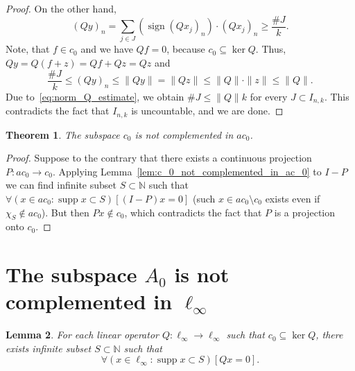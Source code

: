 \documentclass[a4paper,10pt]{article} %
\DeclareMathOperator{\supp}{supp}
\theoremstyle{plain}
\newtheorem{theorem}{Theorem}[section]
\newtheorem{lemma}[theorem]{Lemma}
\theoremstyle{definition}
\begin{document}
\begin{proof}
	On the other hand,
	\begin{equation}
		\label{eq:non_complemented_sum_cardinality}
		(Qy)_n = \sum_{j \in J}
		(\operatorname{sign}(Qx_j)_n)
		\cdot (Qx_j)_n \geq \frac{\# J}{k}
		.
	\end{equation}
	Note, that $f\in c_0$ and we have $Qf = 0$, because $c_0 \subseteq \ker Q$.
	Thus, $Qy = Q(f+z) = Qf + Qz = Qz$ and
	\begin{equation}
		\label{eq:norm_Q_estimate}
		\frac{\# J}{k} \leq (Qy)_n \leq \|Qy\| = \|Qz\| \leq \|Q\| \cdot \|z\| \leq \|Q\|
		.
	\end{equation}
	Due to~\eqref{eq:norm_Q_estimate}, we obtain $\# J \leq \|Q\| k$ for every $J\subset I_{n,k}$.
	This contradicts the fact that $I_{n,k}$ is uncountable,
	and we are done.
\end{proof}

\begin{theorem}
	The subspace $c_0$ is not complemented in $ac_0$.
\end{theorem}

\begin{proof}
	Suppose to the contrary that
	there exists a continuous projection $P: ac_0 \to c_0$.
	Applying Lemma~\ref{lem:c_0_not_complemented_in_ac_0} to $I-P$
	we can find infinite subset $S\subset\mathbb{N}$
	such that $\forall(x\in ac_0 : \supp x \subset S)[(I-P)x = 0]$
	(such $x \in ac_0 \setminus c_0$ exists even if $\chi_S \notin ac_0$).
	But then $Px\notin c_0$,
	which contradicts the fact that $P$ is a projection onto $c_0$.
\end{proof}





\section{The subspace $A_0$ is not complemented in $\ell_\infty$}
\label{sec:A0_in_ell_infty}



\begin{lemma}
	\label{lem:c_0_not_complemented}
	For each linear operator $Q: \ell_\infty \to \ell_{\infty}$ such that $c_0\subseteq \ker Q$,
	there exists infinite subset $S \subset \mathbb{N}$ such that
	\begin{equation}
		\forall(x \in \ell_\infty : \supp x \subset S)[Qx = 0]
		.
	\end{equation}
\end{lemma}
\end{document}
